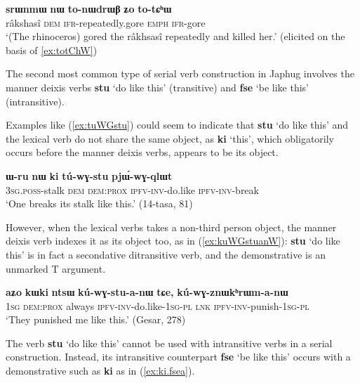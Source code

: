 \documentclass[oneside,a4paper,11pt]{article}
\newcommand{\ipa}[1]{\textbf{\phon#1}} %
\newcommand{\jpg}[2]{\ipa{#1} `#2'} %
\begin{document}
\begin{exe}
\ex \label{ex:totChW2}
\gll 	\ipa{srɯnmɯ} 	\ipa{nɯ} 	\ipa{to-nɯdrɯβ} 	\ipa{ʑo} 	 	\ipa{to-tɕʰɯ} \\
 râkshasî \textsc{dem}  \textsc{ifr}-repeatedly.gore  \textsc{emph}  \textsc{ifr}-gore \\
 \glt `(The rhinoceros) gored the râkhsasî repeatedly and killed her.' (elicited on the basis of \ref{ex:totChW})
\end{exe}	

The second most common type of serial verb construction in Japhug involves the manner deixis verbs \jpg{stu}{do like this} (transitive) and \jpg{fse}{be like this} (intransitive). 

Examples like (\ref{ex:tuWGstu}) could seem to indicate that \jpg{stu}{do like this} and the lexical verb do not share the same object, as  \jpg{ki}{this}, which obligatorily occurs before the manner deixis verbs, appears to be its object. 

\begin{exe}
\ex \label{ex:tuWGstu}
\gll 	
\ipa{ɯ-ru} 	\ipa{nɯ} 	\ipa{ki} 	\ipa{tú-wɣ-stu} 	\ipa{pjɯ́-wɣ-qlɯt} \\
\textsc{3sg.poss}-stalk \textsc{dem} \textsc{dem:prox} \textsc{ipfv-inv}-do.like \textsc{ipfv-inv}-break \\
\glt `One breaks its stalk like this.' (14-tasa, 81)
\end{exe}	

However, when the lexical verbs takes a non-third person object, the manner deixis verb indexes it as its object too, as in (\ref{ex:kuWGstuanW}): \jpg{stu}{do like this} is in fact a secondative ditransitive verb, and the demonstrative is an unmarked T argument.

\begin{exe}
\ex \label{ex:kuWGstuanW}
\gll 	
 \ipa{aʑo} 	\ipa{kɯki} 	\ipa{ntsɯ} 	\ipa{kú-wɣ-stu-a-nɯ} 	\ipa{tɕe,} 	\ipa{kú-wɣ-znɯkʰrɯm-a-nɯ} \\
 \textsc{1sg} \textsc{dem:prox} always \textsc{ipfv-inv}-do.like-\textsc{1sg-pl} \textsc{lnk} \textsc{ipfv-inv}-punish-\textsc{1sg-pl} \\
 \glt `They punished me like this.' (Gesar, 278)
\end{exe}	

The verb \jpg{stu}{do like this} cannot be used with intransitive verbs in a serial construction. Instead, its intransitive counterpart \jpg{fse}{be like this} occurs with a demonstrative such as \ipa{ki} as in (\ref{ex:ki.fsea}).
\end{document}
